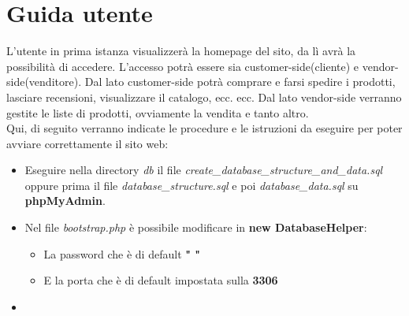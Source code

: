 \documentclass[a4paper,12pt]{report}
\begin{document}
	\section{Guida utente}
	L'utente in prima istanza visualizzerà la homepage del sito, da lì avrà la possibilità di accedere.
	L'accesso potrà essere sia customer-side(cliente) e vendor-side(venditore).
	Dal lato customer-side potrà comprare e farsi spedire i prodotti, lasciare recensioni, visualizzare il catalogo, ecc. ecc.
	Dal lato vendor-side verranno gestite le liste di prodotti, ovviamente la vendita e tanto altro.\\
	
	\textsf{\small Qui, di seguito verranno indicate le procedure e le istruzioni da eseguire per poter avviare correttamente il sito web: } \\
	
	\begin{itemize}
		\item \textsf{\small Eseguire nella directory \emph{db} il file \emph{create\_database\_structure\_and\_data.sql} oppure prima il file \emph{database\_structure.sql} e poi \emph{database\_data.sql} su \textbf{phpMyAdmin}.}
		\item \textsf{\small Nel file \emph{bootstrap.php} è possibile modificare in \textbf{new DatabaseHelper}:}
		\begin{itemize}
			\item \textsf{\small La password che è di default \textbf{" "}}
			\item \textsf{\small E la porta che è di default impostata sulla \textbf{3306}}
		\end{itemize}
		\item \textsf{\small }
	\end{itemize}
\end{document}
